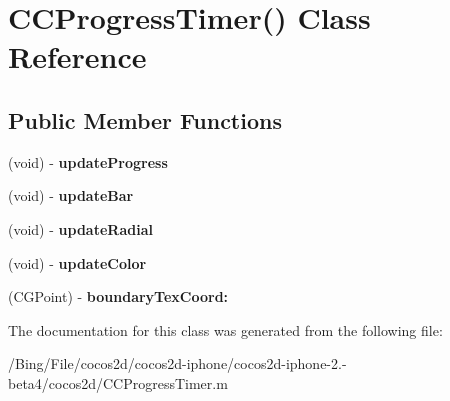 \hypertarget{interface_c_c_progress_timer_07_08}{\section{C\-C\-Progress\-Timer() Class Reference}
\label{interface_c_c_progress_timer_07_08}
}
\subsection*{Public Member Functions}
\begin{DoxyCompactItemize}
\item 
\hypertarget{interface_c_c_progress_timer_07_08_a4b7aa51e62b2fd75cb7f816ae667a58b}{(void) -\/ {\bfseries update\-Progress}}\label{interface_c_c_progress_timer_07_08_a4b7aa51e62b2fd75cb7f816ae667a58b}

\item 
\hypertarget{interface_c_c_progress_timer_07_08_a90dab253c54ade031b67a18aae04910a}{(void) -\/ {\bfseries update\-Bar}}\label{interface_c_c_progress_timer_07_08_a90dab253c54ade031b67a18aae04910a}

\item 
\hypertarget{interface_c_c_progress_timer_07_08_ac1d77722d7779ad4b44534da691ab03a}{(void) -\/ {\bfseries update\-Radial}}\label{interface_c_c_progress_timer_07_08_ac1d77722d7779ad4b44534da691ab03a}

\item 
\hypertarget{interface_c_c_progress_timer_07_08_a719431dbc32b5b38ff0c65de3204970a}{(void) -\/ {\bfseries update\-Color}}\label{interface_c_c_progress_timer_07_08_a719431dbc32b5b38ff0c65de3204970a}

\item 
\hypertarget{interface_c_c_progress_timer_07_08_aaf9cbba9c3ac640b1b79098e021a6446}{(C\-G\-Point) -\/ {\bfseries boundary\-Tex\-Coord\-:}}\label{interface_c_c_progress_timer_07_08_aaf9cbba9c3ac640b1b79098e021a6446}

\end{DoxyCompactItemize}


The documentation for this class was generated from the following file\-:\begin{DoxyCompactItemize}
\item 
/\-Bing/\-File/cocos2d/cocos2d-\/iphone/cocos2d-\/iphone-\/2.-\/beta4/cocos2d/C\-C\-Progress\-Timer.\-m\end{DoxyCompactItemize}
